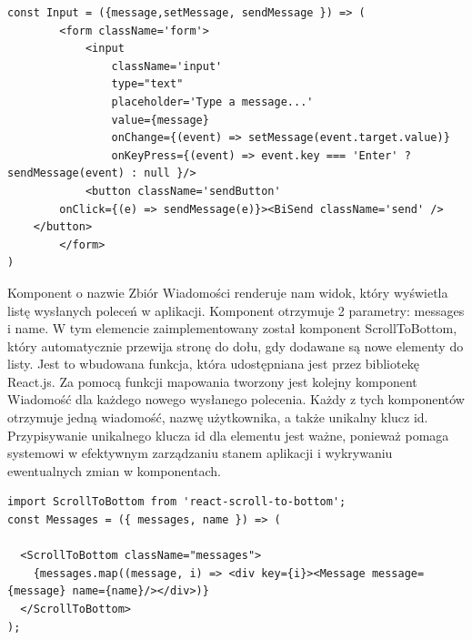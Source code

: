 \begin{lstlisting}[caption=Implementacja komponentu komunikacji ]
const Input = ({message,setMessage, sendMessage }) => (
        <form className='form'>
            <input 
                className='input'
                type="text"
                placeholder='Type a message...'
                value={message}
                onChange={(event) => setMessage(event.target.value)}
                onKeyPress={(event) => event.key === 'Enter' ? sendMessage(event) : null }/>
            <button className='sendButton' 
		onClick={(e) => sendMessage(e)}><BiSend className='send' />
	</button>
        </form>
)
\end{lstlisting}

Komponent o nazwie Zbiór Wiadomości renderuje nam widok, który wyświetla listę wysłanych poleceń w aplikacji. Komponent otrzymuje 2 parametry: messages i name. W tym elemencie zaimplementowany został komponent ScrollToBottom, który automatycznie przewija stronę do dołu, gdy dodawane są nowe elementy do listy. Jest to wbudowana funkcja, która udostępniana jest przez bibliotekę React.js. Za pomocą funkcji mapowania tworzony jest kolejny komponent Wiadomość dla każdego nowego wysłanego polecenia. Każdy z tych komponentów otrzymuje jedną wiadomość, nazwę użytkownika, a także unikalny klucz id. Przypisywanie unikalnego klucza id dla elementu jest ważne, ponieważ pomaga systemowi w efektywnym zarządzaniu stanem aplikacji i wykrywaniu ewentualnych zmian w komponentach.
\begin{lstlisting}[caption=Implementacja komponentu zbior wiadomosci ]
import ScrollToBottom from 'react-scroll-to-bottom';
const Messages = ({ messages, name }) => (
  
  <ScrollToBottom className="messages">
    {messages.map((message, i) => <div key={i}><Message message={message} name={name}/></div>)}
  </ScrollToBottom>
);
\end{lstlisting}

